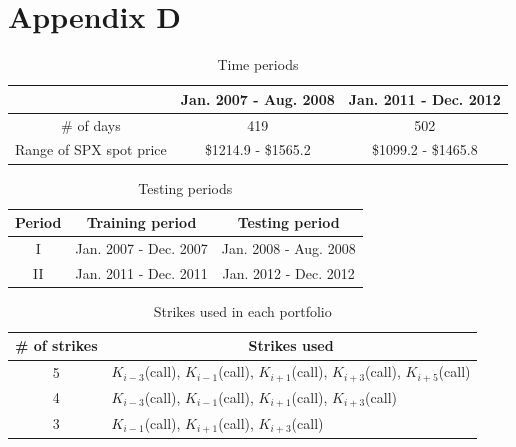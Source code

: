 \documentclass{article}
\numberwithin{equation}{section}
\begin{document}
\section{Appendix D}

\begin{table}[b] 
\centering
\caption{Time periods}\label{tb:implementation:SPX}
\begin{tabular}{|c|c|c|} 
 \hline
 & Jan. 2007 - Aug. 2008 & Jan. 2011 - Dec. 2012\\
\hline
\# of days &  419 & 502 \\
\hline
Range of SPX spot price & \$1214.9 - \$1565.2  & \$1099.2 - \$1465.8 \\
 \hline
\end{tabular}
\end{table}

\begin{table}[b] 
\centering
\caption{Testing periods}\label{tb:compare:periods}
\begin{tabular}{|c|c|c|} 
 \hline
Period & Training period & Testing period\\
\hline
I & Jan. 2007 - Dec. 2007 & Jan. 2008 - Aug. 2008 \\
II & Jan. 2011 - Dec. 2011 & Jan. 2012 - Dec. 2012\\
 \hline
\end{tabular}
\end{table}

\begin{table}[tb]
\centering
 \caption{Strikes used in each portfolio}\label{tb:compare:strikes}
\begin{tabular}{|c|l|} 
\hline
\# of strikes &  \multicolumn{1}{c|}{Strikes used}\\ 
\hline
5 & $K_{i-3}$(call), $K_{i-1}$(call), $K_{i+1}$(call), $K_{i+3}$(call), $K_{i+5}$(call) \\ \hline
4 & $K_{i-3}$(call), $K_{i-1}$(call), $K_{i+1}$(call), $K_{i+3}$(call)\\ \hline
3 & $K_{i-1}$(call), $K_{i+1}$(call), $K_{i+3}$(call)\\
\hline
\end{tabular}
\end{table}
\end{document}
